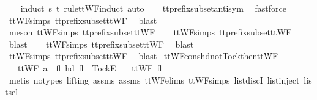 %
\isadelimproof
\ \ %
\endisadelimproof
%
\isatagproof
{}\isamarkupfalse%
\ {\isacharparenleft}induct\ s\ t\ rule{\isacharcolon}ttWF{}{\isachardot}induct{\isacharcomma}\ auto{\isacharparenright}\isanewline
\ \ \isamarkupfalse%
\ tt{\isacharunderscore}prefix{\isacharunderscore}subset{\isacharunderscore}antisym\ \isamarkupfalse%
\ fastforce\isanewline
\ \ \isamarkupfalse%
\ ttWF{\isachardot}simps{\isacharparenleft}{}{}{\isacharparenright}\ tt{\isacharunderscore}prefix{\isacharunderscore}subset{\isacharunderscore}ttWF\ \isamarkupfalse%
\ blast\isanewline
\ \ \isamarkupfalse%
\ {\isacharparenleft}meson\ ttWF{\isachardot}simps{\isacharparenleft}{}{}{\isacharparenright}\ tt{\isacharunderscore}prefix{\isacharunderscore}subset{\isacharunderscore}ttWF{\isacharparenright}\isanewline
\ \ \isamarkupfalse%
\ ttWF{\isachardot}simps{\isacharparenleft}{}{}{\isacharparenright}\ tt{\isacharunderscore}prefix{\isacharunderscore}subset{\isacharunderscore}ttWF\ \isamarkupfalse%
\ blast\isanewline
\ \ \isamarkupfalse%
\ ttWF{\isachardot}simps{\isacharparenleft}{}{\isacharparenright}\ tt{\isacharunderscore}prefix{\isacharunderscore}subset{\isacharunderscore}ttWF\ \isamarkupfalse%
\ blast\isanewline
\ \ \isamarkupfalse%
\ ttWF{\isachardot}simps{\isacharparenleft}{}{\isacharparenright}\ tt{\isacharunderscore}prefix{\isacharunderscore}subset{\isacharunderscore}ttWF\ \isamarkupfalse%
\ blast%
\endisatagproof
{\isafoldproof}%
%
\isadelimproof
\isanewline
%
\endisadelimproof
\isanewline
{}\isamarkupfalse%
\ ttWF{\isacharunderscore}cons{\isacharunderscore}hd{\isacharunderscore}not{\isacharunderscore}Tock{\isacharunderscore}then{\isacharunderscore}ttWF{\isacharcolon}\isanewline
\ \ \ {\isachardoublequoteopen}ttWF\ {\isacharparenleft}a\ {\isacharhash}\ fl{\isacharparenright}{\isachardoublequoteclose}\ {\isachardoublequoteopen}hd\ fl\ {\isasymnoteq}\ {\isacharbrackleft}Tock{\isacharbrackright}\isactrlsub E{\isachardoublequoteclose}\isanewline
\ \ \ {\isachardoublequoteopen}ttWF\ fl{\isachardoublequoteclose}\isanewline
%
\isadelimproof
\ \ %
\endisadelimproof
%
\isatagproof
{}\isamarkupfalse%
\ {\isacharparenleft}metis\ {\isacharparenleft}no{\isacharunderscore}types{\isacharcomma}\ lifting{\isacharparenright}\ assms{\isacharparenleft}{}{\isacharparenright}\ assms{\isacharparenleft}{}{\isacharparenright}\ ttWF{\isachardot}elims{\isacharparenleft}{}{\isacharparenright}\ ttWF{\isachardot}simps{\isacharparenleft}{}{\isacharparenright}\ list{\isachardot}discI\ list{\isachardot}inject\ list{\isachardot}sel{\isacharparenleft}{}{\isacharparenright}{\isacharparenright}%

